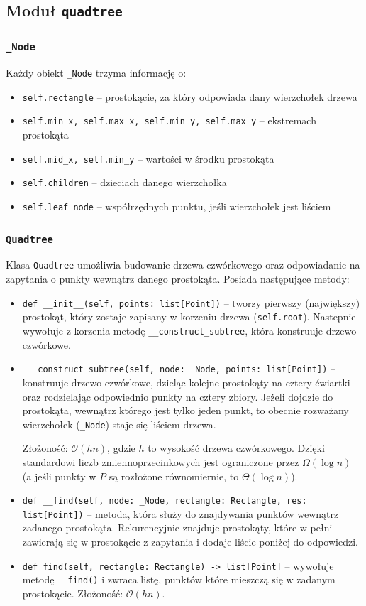 \documentclass[11pt]{scrartcl}
\newcommand{\sO}{\mathcal O}
\begin{document}
\subsection{Moduł \texttt{quadtree}}
\subsubsection{\texttt{\_Node}}
Każdy obiekt \texttt{\_Node} trzyma informację o:
\begin{itemize}
    \item \texttt{self.rectangle} -- prostokącie, za który odpowiada dany wierzchołek drzewa
    \item \texttt{self.min\_x, self.max\_x, self.min\_y, self.max\_y} -- ekstremach prostokąta
    \item \texttt{self.mid\_x, self.min\_y} -- wartości w środku prostokąta
    \item \texttt{self.children} -- dzieciach danego wierzchołka
    \item \texttt{self.leaf\_node} -- współrzędnych punktu, jeśli wierzchołek jest liściem
\end{itemize}

\subsubsection{\texttt{Quadtree}}
Klasa \texttt{Quadtree} umożliwia budowanie drzewa czwórkowego oraz odpowiadanie na zapytania o punkty wewnątrz danego prostokąta. Posiada następujące metody:
\begin{itemize}
    \item \texttt{def \_\_init\_\_(self, points: list[Point])} -- tworzy pierwszy (największy) prostokąt, który zostaje zapisany w korzeniu drzewa (\texttt{self.root}). Nastepnie wywołuje z korzenia metodę \texttt{\_\_construct\_subtree}, która konstruuje drzewo czwórkowe.
    \item \texttt{ \_\_construct\_subtree(self, node: \_Node, points: list[Point])} -- konstruuje drzewo czwórkowe, dzieląc kolejne prostokąty na cztery ćwiartki oraz rodzielając odpowiednio punkty na cztery zbiory. Jeżeli dojdzie do prostokąta, wewnątrz którego jest tylko jeden punkt, to obecnie rozważany wierzchołek (\texttt{\_Node}) staje się liściem drzewa.
    
    Złożoność: $\sO(hn)$, gdzie $h$ to wysokość drzewa czwórkowego. Dzięki standardowi liczb zmiennoprzecinkowych jest ograniczone przez $\Omega(\log n)$ (a jeśli punkty w $P$ są rozłożone równomiernie, to $\Theta(\log n)$).
    \item  \texttt{def \_\_find(self, node: \_Node, rectangle: Rectangle, res: list[Point])} -- metoda, która służy do znajdywania punktów wewnątrz zadanego prostokąta. Rekurencyjnie znajduje prostokąty, które w pełni zawierają się w prostokącie z zapytania i dodaje liście poniżej do odpowiedzi.
    \item \texttt{def find(self, rectangle: Rectangle) -> list[Point]} -- wywołuje metodę \texttt{\_\_find()} i zwraca listę, punktów które mieszczą się w zadanym prostokącie. Złożoność: $\sO(hn)$.
\end{itemize}
\end{document}

